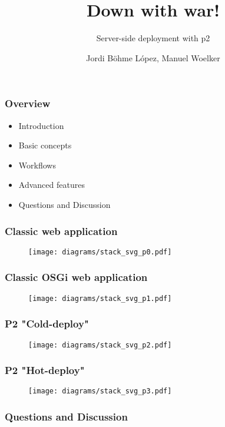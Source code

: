 \documentclass{beamer}
\author[Jordi Böhme López, Manuel Woelker]{Jordi Böhme López, Manuel Woelker}
\title[Down with war!\hspace{2em}\insertframenumber/\inserttotalframenumber]{Down with war!}
\subtitle{Server-side deployment with p2}
\begin{document}
\maketitle


\begin{frame}
  \frametitle{Overview}
  \begin{itemize}
  \item Introduction\pause
  \item Basic concepts\pause
  \item Workflows\pause
  \item Advanced features\pause
  \item Questions and Discussion
  \end{itemize}
\end{frame}


\begin{frame}
  \frametitle{Classic web application}
\begin{figure}
   \texttt{[image: diagrams/stack\_svg\_p0.pdf]}
\end{figure}
\end{frame}

\begin{frame}
  \frametitle{Classic OSGi web application}
\begin{figure}
   \texttt{[image: diagrams/stack\_svg\_p1.pdf]}
\end{figure}
\end{frame}

\begin{frame}
  \frametitle{P2 "Cold-deploy"}
\begin{figure}
   \texttt{[image: diagrams/stack\_svg\_p2.pdf]}
\end{figure}
\end{frame}

\begin{frame}
  \frametitle{P2 "Hot-deploy"}
\begin{figure}
   \texttt{[image: diagrams/stack\_svg\_p3.pdf]}
\end{figure}
\end{frame}

\begin{frame}
  \frametitle{Questions and Discussion}
\end{frame}
\end{document}
